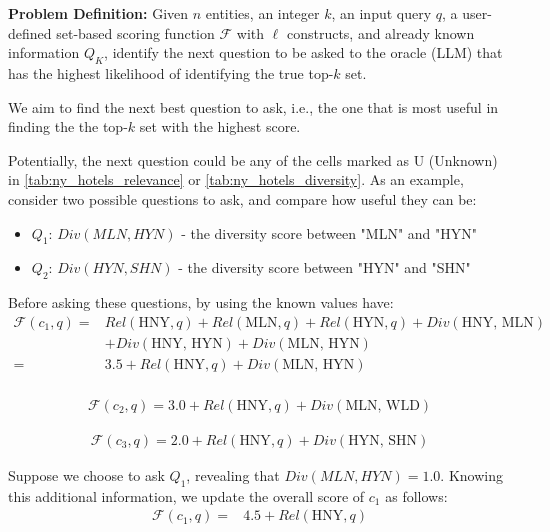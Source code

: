 \textbf{Problem Definition:} Given \( n \) entities, an integer $k$, an input query \( q \), a user-defined set-based scoring function \( \mathcal{F} \) with $\ell$ constructs, and already known information \( Q_K \), identify the next question to be asked to the oracle (LLM) that has the highest likelihood of identifying the true top-$k$ set.


We aim to find the next best question to ask, i.e., the one that is most useful in finding the the top-$k$ set with the highest score.
    
Potentially, the next question could be any of the cells marked as U (Unknown) in \autoref{tab:ny_hotels_relevance} or \autoref{tab:ny_hotels_diversity}. As an example, consider two possible questions to ask, and compare how useful they can be:
    
    \begin{itemize}
        \item \( Q_1 \): \(Div(MLN, HYN)\) - the diversity score between "MLN" and "HYN"
        \item \( Q_2 \): \(Div(HYN, SHN)\) - the diversity score between "HYN" and "SHN"
    \end{itemize}

Before asking these questions, by using the known values have:
\[
\begin{aligned}
    \mathcal{F}(c_1, q) = 
    & Rel(\text{HNY},q) + Rel(\text{MLN},q) + Rel(\text{HYN},q) + Div(\text{HNY, MLN}) \\
    & + Div(\text{HNY, HYN}) + Div(\text{MLN, HYN}) \\
    = & 3.5 + Rel(\text{HNY},q) + Div(\text{MLN, HYN}) \\
\end{aligned}
\]

\[
\begin{aligned}
    \mathcal{F}(c_2, q) =  3.0 + Rel(\text{HNY},q) + Div(\text{MLN, WLD}) 
\end{aligned}
\]

\[
\begin{aligned}
    \mathcal{F}(c_3, q) =  2.0 + Rel(\text{HNY},q) + Div(\text{HYN, SHN}) 
\end{aligned}
\]

Suppose we choose to ask \( Q_1 \), revealing that \(Div(MLN, HYN) = 1.0 \). Knowing this additional information, we update the overall score of \( c_1 \) as follows:
\[
\begin{aligned}
    \mathcal{F}(c_1, q) = 
     & 4.5 + Rel(\text{HNY},q) \\
\end{aligned}
\]

